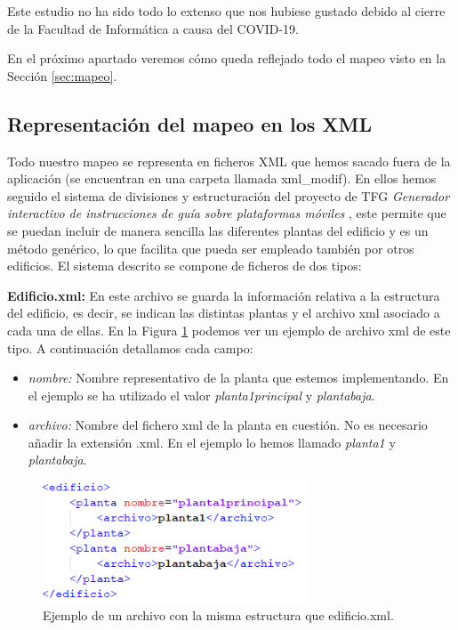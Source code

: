 Este estudio no ha sido todo lo extenso que nos hubiese gustado debido al cierre de la Facultad de Informática a causa del COVID-19.

En el próximo apartado veremos cómo queda reflejado todo el mapeo visto en la Sección \ref{sec:mapeo}.

\subsection{Representación del mapeo en los XML}
\label{sub:mapeo_xml}
Todo nuestro mapeo se representa en ficheros XML que hemos sacado fuera de la aplicación (se encuentran en una carpeta llamada xml\_modif). En ellos hemos seguido el sistema de divisiones y estructuración del proyecto de TFG \textit{Generador interactivo de instrucciones de guía sobre plataformas móviles} \citep{TFGguia}, este permite que se puedan incluir
de manera sencilla las diferentes plantas del edificio y es un método genérico, lo que facilita que pueda ser empleado también por otros edificios. El sistema descrito se compone de ficheros de dos tipos:

\textbf{Edificio.xml:} En este archivo se guarda la información relativa a la estructura del edificio, es decir, se indican las distintas plantas y el archivo xml asociado a cada una de ellas. En la Figura \ref{fig:xmledificio} podemos ver un ejemplo de archivo xml de este tipo. A continuación detallamos cada campo:
\begin{itemize}
	\item \textit{nombre:} Nombre representativo de la planta que estemos implementando. En el ejemplo se ha utilizado el valor \textit{planta1principal} y \textit{plantabaja}.
	\item \textit{archivo:} Nombre del fichero xml de la planta en cuestión. No es necesario añadir la extensión .xml. En el ejemplo lo hemos llamado \textit{planta1} y \textit{plantabaja}.
\end{itemize}

\begin{figure}[t]
	\centering
	\includegraphics[width=0.7\textwidth]{Imagenes/Descripciondeltrabajo/edificioXML}
	\caption{Ejemplo de un archivo con la misma estructura que edificio.xml.}
	\label{fig:xmledificio}
\end{figure}


